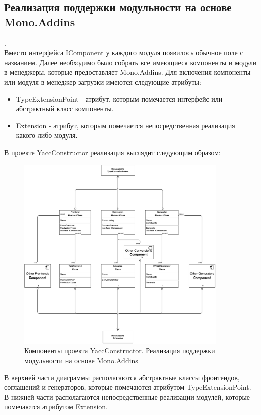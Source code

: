 \documentclass{matmex-diploma}
\begin{document}
\begin{enumerate}
\newpage
\subsection {Реализация поддержки модульности на основе \\Mono.Addins}.
\\Вместо интерфейса IComponent у каждого модуля появилось обычное поле с названием. Далее необходимо было собрать все имеющиеся компоненты и модули в менеджеры, которые предоставляет Mono.Addins. 
Для включения компоненты или модуля в менеджер загрузки имеются следующие атрибуты:
\begin{itemize}
\item TypeExtensionPoint - атрибут, которым помечается интерфейс или абстрактный класс компоненты.
\item Extension - атрибут, которым помечается непосредственная реализация какого-либо модуля.
\end{itemize}

В проекте YaccConstructor реализация выглядит следующим образом:
\begin{figure}[h!]
\begin{center}
\includegraphics[width=0.9\textwidth]{yc_now}
\caption{Компоненты проекта YaccConstructor. Реализация поддержки модульности на основе Mono.Addins}
\label{fig:yc_now} 
\end{center}
\end{figure}

\newpage
В верхней части диаграммы располагаются абстрактные классы фронтендов, соглашений и генераторов, которые помечаются атрибутом TypeExtensionPoint.
В нижней части располагаются непосредственные реализации модулей, которые помечаются атрибутом Extension.


\end{enumerate}
\end{document}
